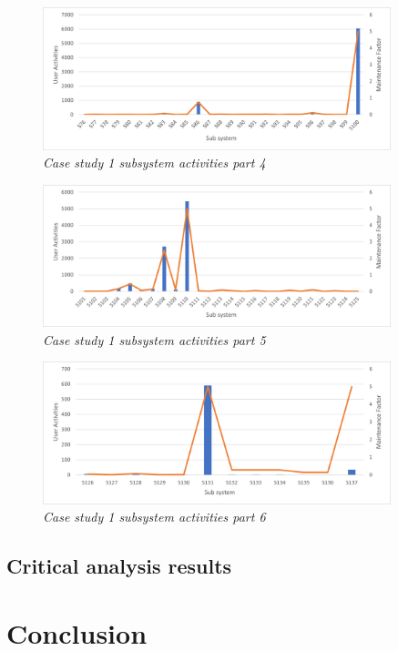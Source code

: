 \begin{figure}[!htb]
	\centering %
	\includegraphics[width=0.9\textwidth]{img/ch3/uat/systemA/s76_s100.png}
	\caption[Case study 1 subsystem activities part 4]
	{\textit{Case study 1 subsystem activities part 4}}\label{fig:ch3_saS76S100}
\end{figure} 

\begin{figure}[!htb]
	\centering %
	\includegraphics[width=0.9\textwidth]{img/ch3/uat/systemA/s101_s125.png}
	\caption[Case study 1 subsystem activities part 5]
	{\textit{Case study 1 subsystem activities part 5}}\label{fig:ch3_saS101S125}
\end{figure} 

\begin{figure}[!htb]
	\centering %
	\includegraphics[width=0.9\textwidth]{img/ch3/uat/systemA/s126_s138.png}
	\caption[Case study 1 subsystem activities part 6]
	{\textit{Case study 1 subsystem activities part 6}}\label{fig:ch3_saS126S138}
\end{figure} 

\clearpage

\subsection{Critical analysis results}

\section{Conclusion}